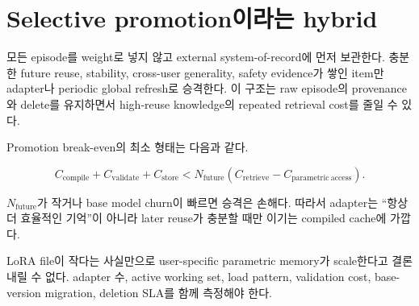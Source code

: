 \section{Selective promotion이라는 hybrid}

모든 episode를 weight로 넣지 않고 external system-of-record에 먼저 보관한다. 충분한 future
reuse, stability, cross-user generality, safety evidence가 쌓인 item만 adapter나 periodic global
refresh로 승격한다. 이 구조는 raw episode의 provenance와 delete를 유지하면서 high-reuse
knowledge의 repeated retrieval cost를 줄일 수 있다.

Promotion break-even의 최소 형태는 다음과 같다.

\begin{equation}
  C_{\mathrm{compile}}+C_{\mathrm{validate}}+C_{\mathrm{store}}
  < N_{\mathrm{future}}\left(C_{\mathrm{retrieve}}-C_{\mathrm{parametric\ access}}\right).
  \label{eq:bg-promotion-break-even}
\end{equation}

$N_{\mathrm{future}}$가 작거나 base model churn이 빠르면 승격은 손해다. 따라서 adapter는
``항상 더 효율적인 기억''이 아니라 later reuse가 충분할 때만 이기는 compiled cache에
가깝다.

\begin{cautionbox}[작은 delta의 함정]
LoRA file이 작다는 사실만으로 user-specific parametric memory가 scale한다고 결론 내릴 수
없다. adapter 수, active working set, load pattern, validation cost, base-version migration,
deletion SLA를 함께 측정해야 한다.
\end{cautionbox}
